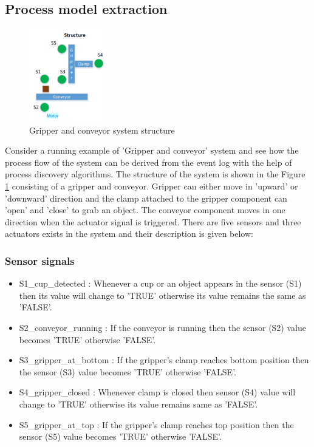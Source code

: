 \begin{bibunit}
   \section{Process model extraction}
   \label{sec:processmodelextraction}
   \begin{figure}[!t]
	   \centering
	   \includegraphics[width=0.3\textwidth]{MX_Papers/Paper5/images/structure.PNG}
	   \caption{Gripper and conveyor system structure}
	   \label{fig:structure}
   \end{figure}
   
   Consider a running example of  'Gripper and conveyor' system and see how the process flow of the system can be derived from the event log with the help of process discovery algorithms. The structure of the system is shown in the Figure \ref{fig:structure} consisting of a gripper and conveyor. Gripper can either move in 'upward' or 'downward' direction and the clamp attached to the gripper component can 'open' and 'close' to grab an object. The conveyor component moves in one direction when the actuator signal is triggered. There are five sensors and three actuators exists in the system and their description is given below:
   
   
   \subsubsection{Sensor signals} 
   \begin{itemize}
	 \item S1\_cup\_detected : Whenever a cup or an object appears in the sensor (S1) then its value will change to 'TRUE' otherwise its value remains the same as 'FALSE'. 
	 \item  S2\_conveyor\_running : If the conveyor is running then the sensor (S2) value becomes 'TRUE' otherwise 'FALSE'.
	 \item S3\_gripper\_at\_bottom : If the gripper's clamp reaches bottom position then the sensor (S3) value becomes 'TRUE' otherwise 'FALSE'.
	 \item S4\_gripper\_closed : Whenever clamp is closed then  sensor (S4) value will change to 'TRUE' otherwise its value remains same as 'FALSE'.
	 \item S5\_gripper\_at\_top : If the gripper's clamp reaches top position then the sensor (S5) value becomes 'TRUE' otherwise 'FALSE'.
   \end{itemize} 
   

\end{bibunit}
